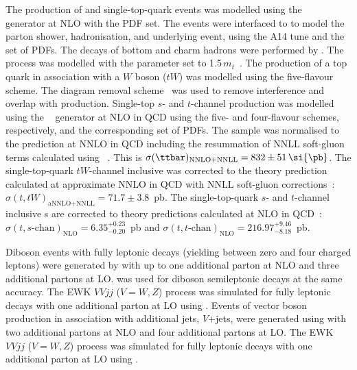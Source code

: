 \documentclass[cernpreprint, atlasdraft=false, texlive=2023, UKenglish, texmf, orcidlogo]{atlasdoc}
\begin{document}
 
The production of \ttbar and single-top-quark events was modelled using the
\POWHEGBOX[v2]~\cite{Frixione:2007nw,Nason:2004rx,Frixione:2007vw,Alioli:2010xd,Re:2010bp,Frederix:2012dh,Alioli:2009je}~
generator at NLO with the \NNPDF[3.0nlo]
PDF set. The events were interfaced
to \PYTHIA[8.230]
to model the parton shower,
hadronisation, and underlying event, using
the A14 tune and the \NNPDF[2.3lo]
set of PDFs.
The decays of bottom and charm hadrons
were performed by \EVTGEN[1.6.0].
The \ttbar process was modelled with the \hdamp parameter set
to 1.5\,$m_t$~\cite{ATL-PHYS-PUB-2016-020}.
The production of a top quark in association with a \(W\) boson (\(tW\)) was
modelled using the five-flavour scheme. The diagram removal scheme~\cite{Frixione:2008yi} was used to remove
interference and overlap with \ttbar production.
Single-top \(s\)- and \(t\)-channel production was modelled using the
\POWHEGBOX[v2]~\cite{Frederix:2012dh,Alioli:2009je} generator at NLO in QCD using the five- and four-flavour schemes, respectively, and the
corresponding \NNPDF[3.0nlo] set of PDFs.
The \ttbar sample was normalised to the \xs prediction at NNLO
in QCD including the resummation of NNLL soft-gluon terms calculated using
\TOPpp[2.0]~\cite{Beneke:2011mq,Cacciari:2011hy,Baernreuther:2012ws,Czakon:2012zr,Czakon:2012pz,Czakon:2013goa-fixed,Czakon:2011xx}.
This \xs is \(\sigma(\ttbar)_{\text{NNLO+NNLL}} = 832 \pm 51\,\si{\pb}\).
The single-top-quark \(tW\)-channel inclusive \xs was corrected to
the theory prediction calculated at approximate NNLO in QCD with NNLL soft-gluon
corrections~\cite{Kidonakis:2010ux,Kidonakis:2013zqa}: \(\sigma(t,tW)_{\text{aNNLO+NNLL}} = 71.7 \pm 3.8\)~pb. The single-top-quark \(s\)- and \(t\)-channel inclusive \xs{}s are corrected to theory predictions calculated at NLO in QCD~\cite{Aliev:2010zk,Kant:2014oha}:
\(\sigma(t,s\text{-chan})_{\text{NLO}} = 6.35^{+0.23}_{-0.20}\)~pb and
\(\sigma(t,t\text{-chan})_\text{NLO}= 216.97^{+9.46}_{-8.18}\)~pb.
 
 
Diboson events with fully leptonic decays (yielding between zero and
four charged leptons) were generated by \SHERPA[2.2.2] with up to
one additional parton at NLO and three additional partons at LO.
\SHERPA[2.2.1] was used for diboson semileptonic decays at the same
accuracy. The EWK $VVjj$ ($V=W,Z$) process was simulated for fully
leptonic decays with one additional parton at LO using \SHERPA[2.2.2].
Events of vector boson production in association with additional jets,
$V$+jets, were generated using \SHERPA[2.2.1] with two additional
partons at NLO and four additional partons at LO. The EWK $VVjj$
($V=W,Z$) process was simulated for fully leptonic decays with one
additional parton at LO using \SHERPA[2.2.2].
 
\end{document}
